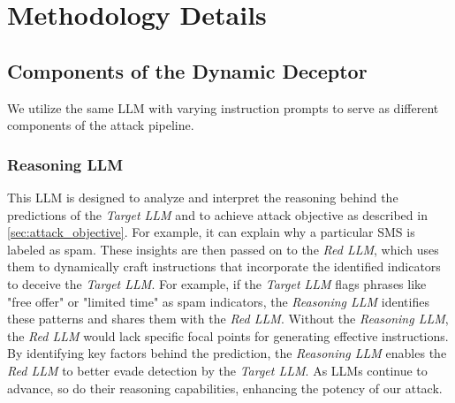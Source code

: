 \documentclass[11pt]{article}
\begin{document}
\section{Methodology Details}

\subsection{Components of the Dynamic Deceptor}
\label{sec:components}
We utilize the same LLM with varying instruction prompts to serve as different components of the attack pipeline.



\subsubsection{Reasoning LLM}
This LLM is designed to analyze and interpret the reasoning behind the predictions of the \textsl{Target LLM} and to achieve attack objective  as described in \ref{sec:attack_objective}. For example, it can explain why a particular SMS is labeled as spam. These insights are then passed on to the \textsl{Red LLM}, which uses them to dynamically craft instructions that incorporate the identified indicators to deceive the \textsl{Target LLM}.
For example, if the \textsl{Target LLM} flags phrases like "free offer" or "limited time" as spam indicators, the \textsl{Reasoning LLM} identifies these patterns and shares them with the \textsl{Red LLM}. Without the \textsl{Reasoning LLM}, the \textsl{Red LLM} would lack specific focal points for generating effective instructions.  By identifying key factors behind the prediction, the \textsl{Reasoning LLM} enables the \textsl{Red LLM} to better evade detection by the \textsl{Target LLM}. As LLMs continue to advance, so do their reasoning capabilities, enhancing the potency of our attack.
\end{document}
